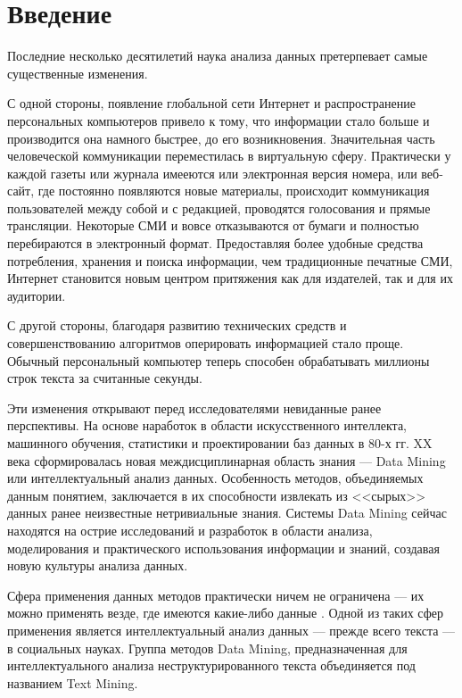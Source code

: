 \chapter*{Введение}							%

Последние несколько десятилетий наука анализа данных претерпевает самые существенные изменения. 

С одной стороны, появление глобальной сети Интернет и распространение персональных компьютеров привело к тому, что информации стало больше и производится она намного быстрее, до его возникновения. Значительная часть человеческой коммуникации переместилась в виртуальную сферу. Практически у каждой газеты или журнала имееются или электронная версия номера, или веб-сайт, где постоянно появляются новые материалы, происходит коммуникация пользователей между собой и с редакцией, проводятся голосования и прямые трансляции. Некоторые СМИ и вовсе отказываются от бумаги и полностью перебираются в электронный формат. Предоставляя более удобные средства потребления, хранения и поиска информации, чем традиционные печатные СМИ, Интернет становится новым центром притяжения как для издателей, так и для их аудитории.

С другой стороны, благодаря развитию технических средств и совершенствованию алгоритмов оперировать информацией стало проще. Обычный персональный компьютер теперь способен обрабатывать миллионы строк текста за считанные секунды.

Эти изменения открывают перед исследователями невиданные ранее перспективы. На основе наработок в области искусственного интеллекта, машинного обучения, статистики и проектировании баз данных в 80-х гг. XX века сформировалась новая междисциплинарная область знания --- Data Mining или интеллектуальный анализ данных. Особенность методов, объединяемых данным понятием, заключается в их способности извлекать из <<сырых>> данных ранее неизвестные нетривиальные знания. Системы Data Mining сейчас находятся на острие исследований и разработок в области анализа, моделирования и практического использования информации и знаний, создавая новую культуры анализа данных.

Сфера применения данных методов практически ничем не ограничена --- их можно применять везде, где имеются какие-либо данные \cite[стр. 81]{Duk2011}. Одной из таких сфер применения является интеллектуальный анализ данных --- прежде всего текста --- в социальных науках. Группа методов Data Mining, предназначенная для интеллектуального анализа неструктурированного текста объединяется под названием Text Mining.

